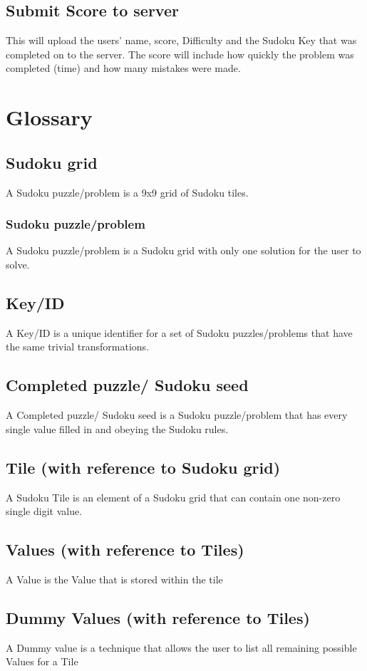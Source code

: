 \documentclass[fleqn]{article}
\begin{document}
\subsection{Submit Score to server}
This will upload the users’ name, score, Difficulty and the Sudoku Key that was completed on to the server. The score will include how quickly the problem was completed (time) and how many mistakes were made.

\section{Glossary}
\subsection*{Sudoku grid}
A Sudoku puzzle/problem is a 9x9 grid of Sudoku tiles.
\subsubsection*{Sudoku puzzle/problem}
A Sudoku puzzle/problem is a Sudoku grid with only one solution for the user to solve.
\subsection*{Key/ID}
A Key/ID is a unique identifier for a set of Sudoku puzzles/problems that have the same trivial transformations.
\subsection*{Completed puzzle/ Sudoku seed}
A Completed puzzle/ Sudoku seed is a Sudoku puzzle/problem that has every single value filled in and obeying the Sudoku rules.
\subsection*{Tile (with reference to Sudoku grid)}
A Sudoku Tile is an element of a Sudoku grid that can contain one non-zero single digit value.
\subsection*{Values (with reference to Tiles)}
A Value is the Value that is stored within the tile
\subsection*{Dummy Values (with reference to Tiles)}
A Dummy value is a technique that allows the user to list all remaining possible Values for a Tile 
\end{document}
